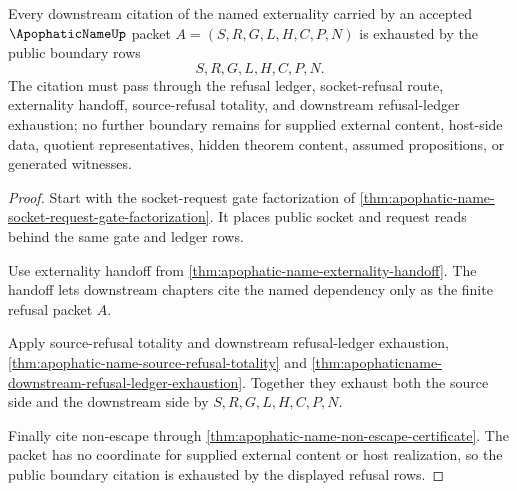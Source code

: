 \begin{theorem}
\label{thm:apophatic-name-boundary-citation-exhaustion}
Every downstream citation of the named externality carried by an accepted $\ApophaticNameUp$ packet $A=(S,R,G,L,H,C,P,N)$ is exhausted by the public boundary rows
$$
S,R,G,L,H,C,P,N.
$$
The citation must pass through the refusal ledger, socket-refusal route, externality handoff, source-refusal totality, and downstream refusal-ledger exhaustion; no further boundary remains for supplied external content, host-side data, quotient representatives, hidden theorem content, assumed propositions, or generated witnesses.
\end{theorem}
\begin{proof}
Start with the socket-request gate factorization of \autoref{thm:apophatic-name-socket-request-gate-factorization}. It places public socket and request reads behind the same gate and ledger rows.

Use externality handoff from \autoref{thm:apophatic-name-externality-handoff}. The handoff lets downstream chapters cite the named dependency only as the finite refusal packet $A$.

Apply source-refusal totality and downstream refusal-ledger exhaustion, \autoref{thm:apophatic-name-source-refusal-totality} and \autoref{thm:apophaticname-downstream-refusal-ledger-exhaustion}. Together they exhaust both the source side and the downstream side by $S,R,G,L,H,C,P,N$.

Finally cite non-escape through \autoref{thm:apophatic-name-non-escape-certificate}. The packet has no coordinate for supplied external content or host realization, so the public boundary citation is exhausted by the displayed refusal rows.
\end{proof}

